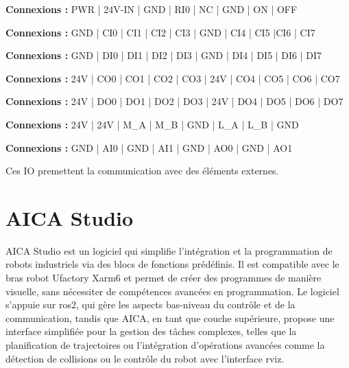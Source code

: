 \begin{tcolorbox}[colframe=black, colback=PowerColor, title=Power]
    \textbf{Connexions :} PWR | 24V-IN | GND | RI0 | NC | GND | ON | OFF
\end{tcolorbox}

\begin{tcolorbox}[colframe=black, colback=ConfigInputColor, title=Configurable Inputs]
    \textbf{Connexions :} GND | CI0 | CI1 | CI2 | CI3 | GND | CI4 | CI5 |CI6 | CI7
\end{tcolorbox}

\begin{tcolorbox}[colframe=black, colback=DigitalInputColor, title=Digital Inputs]
    \textbf{Connexions :} GND |  DI0 | DI1 | DI2 | DI3 | GND | DI4 | DI5 | DI6 | DI7
\end{tcolorbox}

\begin{tcolorbox}[colframe=black, colback=ConfigOutputColor, title=Configurable Outputs]
    \textbf{Connexions :} 24V | CO0 | CO1 | CO2 | CO3 | 24V | CO4 | CO5 | CO6 | CO7
\end{tcolorbox}

\begin{tcolorbox}[colframe=black, colback=DigitalOutputColor, title=Digital Outputs]
    \textbf{Connexions :} 24V | DO0 | DO1 | DO2 | DO3 | 24V | DO4 | DO5 | DO6 | DO7
\end{tcolorbox}

\begin{tcolorbox}[colframe=black, colback=RS485Color, title=RS485]
    \textbf{Connexions :} 24V | 24V | M\_A | M\_B | GND | L\_A | L\_B | GND
\end{tcolorbox}

\begin{tcolorbox}[colframe=black, colback=AnalogColor, title=Analog]
    \textbf{Connexions :} GND | AI0 | GND | AI1 | GND | AO0 | GND | AO1
\end{tcolorbox}

Ces IO premettent la communication avec des éléments externes.

\section{AICA Studio}
AICA Studio est un logiciel qui simplifie l'intégration et la programmation de robots industriels via des blocs de fonctions prédéfinis. Il est compatible avec le bras robot Ufactory Xarm6 et permet de créer des programmes de manière visuelle, sans nécessiter de compétences avancées en programmation. Le logiciel s'appuie sur \gls{ros2}, qui gère les aspects bas-niveau du contrôle et de la communication, tandis que AICA, en tant que couche supérieure, propose une interface simplifiée pour la gestion des tâches complexes, telles que la planification de trajectoires ou l'intégration d'opérations avancées comme la détection de collisions ou le contrôle du robot avec l'interface \gls{rviz}.

